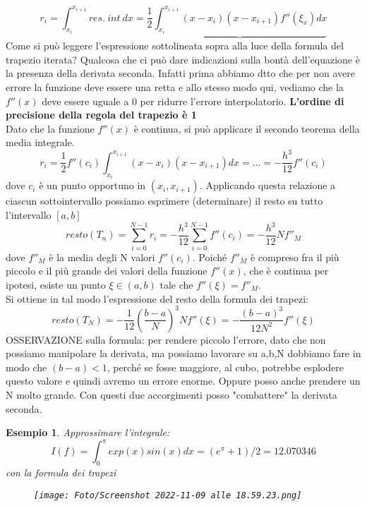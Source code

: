\documentclass[a4paper, portrait]{book}
\numberwithin{equation}{chapter} %
\newtheorem{example}{Esempio}
\begin{document}
\begin{equation}
    r_i = \int_{x_i}^{x_{i+1}} res. \ int \ dx = \frac{1}{2} \underbrace{\int_{x_i}^{x_{i+1}}(x-x_i)(x-x_{i+1})f''(\xi_x) dx}
\end{equation}
Come si può leggere l'espressione sottolineata sopra alla luce della formula del trapezio iterata? Qualcosa che ci può dare indicazioni sulla bontà dell'equazione è la presenza della derivata seconda. Infatti prima abbiamo dtto che per non avere errore la funzione deve essere una retta e allo stesso modo qui, vediamo che la $f''(x)$ deve essere uguale a 0 per ridurre l'errore interpolatorio. \textbf{L'ordine di precisione della regola del trapezio è 1}\\
Dato che la funzione $f''(x)$ è continua, si può applicare il secondo teorema della media integrale.
\begin{equation}
    r_i = \frac{1}{2}f''(c_i)\int_{x_i}^{x_{i+1}}(x-x_i)(x-x_{i+1})dx = ... = -\frac{h^3}{12}f''(c_i)
\end{equation}
dove $c_i$ è un punto opportuno in $(x_i, x_{i+1})$. Applicando questa relazione a ciascun sottointervallo possiamo esprimere (determinare) il resto su tutto l'intervallo $[a,b]$
\begin{equation}
    resto(T_n) = \sum_{i=0}^{N-1} r_i = -\frac{h^3}{12}\sum_{i=0}^{N-1} f''(c_i) = -\frac{h^3}{12}N f''_M
\end{equation}
dove $f''_M$ è la media degli N valori $f''(c_i)$. Poiché $f''_M$ è compreso fra il più piccolo e il più grande dei valori della funzione $f''(x)$, che è continua per ipotesi, esiste un punto $\xi \in (a,b)$ tale che $f''(\xi) = f''_M$.\\
Si ottiene in tal modo l'espressione del resto della formula dei trapezi:
\begin{equation}
    resto(T_N) = -\frac{1}{12}\left(\frac{b-a}{N}\right)^3 N f''(\xi) = -\frac{(b-a)^3}{12N^2}f''(\xi)
\end{equation}
OSSERVAZIONE sulla formula: per rendere piccolo l'errore, dato che non possiamo manipolare la derivata, ma possiamo lavorare su a,b,N dobbiamo fare in modo che $(b-a)<1$, perché se fosse maggiore, al cubo, potrebbe esplodere questo valore e quindi avremo un errore enorme. Oppure posso anche prendere un N molto grande. Con questi due accorgimenti posso "combattere" la derivata seconda.
\newpage
\begin{example}
    Approssimare l'integrale:
    \begin{equation}
        I(f) = \int_0^\pi exp(x) sin (x) dx = (e^\pi +1)/2 = 12.070346
    \end{equation}
    con la formula dei trapezi
    \begin{figure}[h!]
        \centering
        \texttt{[image: Foto/Screenshot 2022-11-09 alle 18.59.23.png]}
        \caption{}
    \end{figure}
\end{example}
\end{document}
